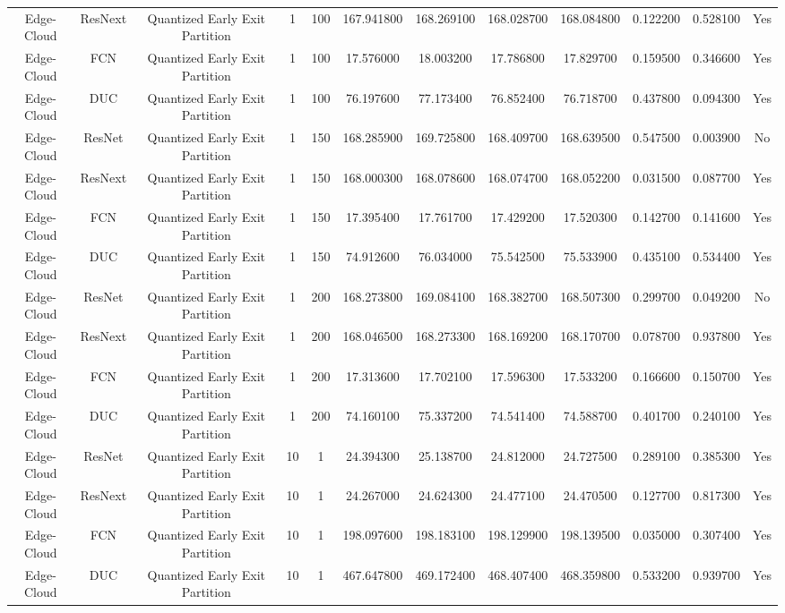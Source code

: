 \begin{tabular}{|c||c||c||c||c||c||c||c||c||c||c||c|}
Edge-Cloud & ResNext & Quantized Early Exit Partition & 1 & 100 & 167.941800 & 168.269100 & 168.028700 & 168.084800 & 0.122200 & 0.528100 & Yes \\
Edge-Cloud & FCN & Quantized Early Exit Partition & 1 & 100 & 17.576000 & 18.003200 & 17.786800 & 17.829700 & 0.159500 & 0.346600 & Yes \\
Edge-Cloud & DUC & Quantized Early Exit Partition & 1 & 100 & 76.197600 & 77.173400 & 76.852400 & 76.718700 & 0.437800 & 0.094300 & Yes \\
Edge-Cloud & ResNet & Quantized Early Exit Partition & 1 & 150 & 168.285900 & 169.725800 & 168.409700 & 168.639500 & 0.547500 & 0.003900 & No \\
Edge-Cloud & ResNext & Quantized Early Exit Partition & 1 & 150 & 168.000300 & 168.078600 & 168.074700 & 168.052200 & 0.031500 & 0.087700 & Yes \\
Edge-Cloud & FCN & Quantized Early Exit Partition & 1 & 150 & 17.395400 & 17.761700 & 17.429200 & 17.520300 & 0.142700 & 0.141600 & Yes \\
Edge-Cloud & DUC & Quantized Early Exit Partition & 1 & 150 & 74.912600 & 76.034000 & 75.542500 & 75.533900 & 0.435100 & 0.534400 & Yes \\
Edge-Cloud & ResNet & Quantized Early Exit Partition & 1 & 200 & 168.273800 & 169.084100 & 168.382700 & 168.507300 & 0.299700 & 0.049200 & No \\
Edge-Cloud & ResNext & Quantized Early Exit Partition & 1 & 200 & 168.046500 & 168.273300 & 168.169200 & 168.170700 & 0.078700 & 0.937800 & Yes \\
Edge-Cloud & FCN & Quantized Early Exit Partition & 1 & 200 & 17.313600 & 17.702100 & 17.596300 & 17.533200 & 0.166600 & 0.150700 & Yes \\
Edge-Cloud & DUC & Quantized Early Exit Partition & 1 & 200 & 74.160100 & 75.337200 & 74.541400 & 74.588700 & 0.401700 & 0.240100 & Yes \\
Edge-Cloud & ResNet & Quantized Early Exit Partition & 10 & 1 & 24.394300 & 25.138700 & 24.812000 & 24.727500 & 0.289100 & 0.385300 & Yes \\
Edge-Cloud & ResNext & Quantized Early Exit Partition & 10 & 1 & 24.267000 & 24.624300 & 24.477100 & 24.470500 & 0.127700 & 0.817300 & Yes \\
Edge-Cloud & FCN & Quantized Early Exit Partition & 10 & 1 & 198.097600 & 198.183100 & 198.129900 & 198.139500 & 0.035000 & 0.307400 & Yes \\
Edge-Cloud & DUC & Quantized Early Exit Partition & 10 & 1 & 467.647800 & 469.172400 & 468.407400 & 468.359800 & 0.533200 & 0.939700 & Yes \\

\end{tabular}
